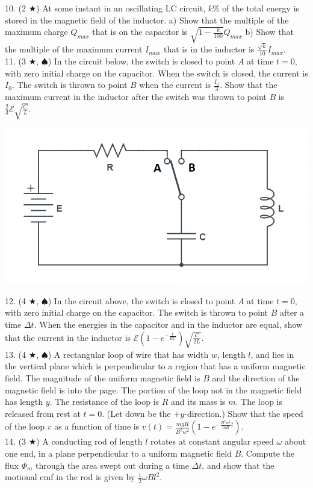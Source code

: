 10. (2 $\bigstar$) At some instant in an oscillating LC circuit, $k$\% of the total energy is stored in the magnetic field of the inductor. a) Show that the multiple of the maximum charge $Q_{max}$ that is on the capacitor is $\sqrt{1-\frac{k}{100}}Q_{max}$ b) Show that the multiple of the maximum current $I_{max}$ that is in the inductor is $\frac{\sqrt{k}}{10}I_{max}$.\\
11. (3 $\bigstar$, $\spadesuit$) In the circuit below, the switch is closed to point $A$ at time $t=0$, with zero initial charge on the capacitor. When the switch is closed, the current is $I_0$. The switch is thrown to point $B$ when the current is $\frac{I_0}{3}$. Show that the maximum current in the inductor after the switch was thrown to point $B$ is $\frac{2}{3} \mathscr{E} \sqrt{\frac{C}{L}}$.
\begin{center}
\includegraphics[scale=0.42]{images/em/switchingcircuit.png}
\end{center}
12. (4 $\bigstar$, $\spadesuit$) In the circuit above, the switch is closed to point $A$ at time $t=0$, with zero initial charge on the capacitor. The switch is thrown to point $B$ after a time $\Delta t$. When the energies in the capacitor and in the inductor are equal, show that the current in the inductor is $\mathscr{E}(1- e^{-\frac{t}{RC}})\sqrt{\frac{C}{2L}}$. \\
13. (4 $\bigstar$, $\spadesuit$) A rectangular loop of wire that has width $w$, length $l$, and lies in the vertical plane which is perpendicular to a region that has a uniform magnetic field. The magnitude of the uniform magnetic field is $B$ and the direction of the magnetic field is into the page. The portion of the loop not in the magnetic field has length $y$. The resistance of the loop is $R$ and its mass is
$m$. The loop is released from rest at $t = 0$. (Let down be the $+y$-direction.) Show that the speed of the loop $v$ as a function of time is $v(t) = \frac{mgR}{B^2w^2}(1- e^{-\frac{B^2w^2}{mR}t})$.\\
14. (3 $\bigstar$) A conducting rod of length $l$ rotates at constant angular speed $\omega$ about one end, in a plane perpendicular to a uniform magnetic field $B$. Compute the flux $\Phi_m$ through the area swept out during a time $\Delta t$, and show that the motional emf in the rod is given by $\frac{1}{2}\omega Bl^2$.

\pagebreak